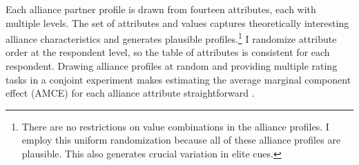 \documentclass[12pt]{article}
\begin{document}
Each alliance partner profile is drawn from fourteen attributes, each with multiple levels. 
The set of attributes and values captures theoretically interesting alliance characteristics and generates plausible profiles.\footnote{There are no restrictions on value combinations in the alliance profiles. I employ this uniform randomization because all of these alliance profiles are plausible. This also generates crucial variation in elite cues.}
I randomize attribute order at the respondent level, so the table of attributes is consistent for each respondent. 
Drawing alliance profiles at random and providing multiple rating tasks in a conjoint experiment makes estimating the average marginal component effect (AMCE) for each alliance attribute straightforward \citep{Hainmuelleretal2014}. 
\end{document}
